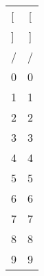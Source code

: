 \documentclass[a4paper]{article}
\newcommand{\wb}[2]{\fontsize{#1}{#2}\usefont{U}{webo}{xl}{n}}
\newcommand{\showb}[1]{\wb{20}{24}#1}
\begin{document}
\begin{center}
  \begin{tabular}{lc}
    [ & \showb{[} \\[1ex]
    ] & \showb{]} \\[1ex]
    / & \showb{/} \\[1ex]
    0 & \showb{0} \\[1ex]
    1 & \showb{1} \\[1ex]
    2 & \showb{2} \\[1ex]
    3 & \showb{3} \\[1ex]
    4 & \showb{4} \\[1ex]
    5 & \showb{5} \\[1ex]
    6 & \showb{6} \\[1ex]
    7 & \showb{7} \\[1ex]
    8 & \showb{8} \\[1ex]
    9 & \showb{9}
  \end{tabular}
\end{center}
\end{document}
